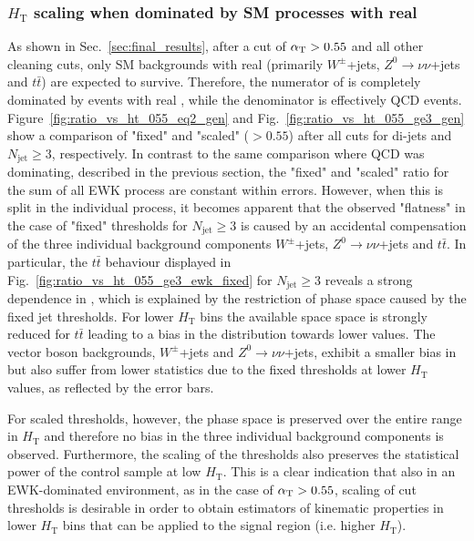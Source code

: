 \subsubsection{$H_{\mathrm{T}}$ scaling when dominated by SM processes
with real \mymet} 

As shown in Sec.~\ref{sec:final_results}, after a cut of $\alpha_{\mathrm{T}}>0.55$
and all other cleaning cuts, only SM backgrounds with real \mymet
(primarily $W^{\pm}$+jets, $Z^{0}\rightarrow\nu\nu$+jets and
$t\bar{t}$) are expected to survive. Therefore, the numerator of \RaT
is completely dominated by events with real \mymet, while the
denominator is effectively QCD
events. Figure~\ref{fig:ratio_vs_ht_055_eq2_gen} and
Fig.~\ref{fig:ratio_vs_ht_055_ge3_gen} show a comparison of "fixed"
and "scaled" \raT(\aT$>0.55$) after all cuts for di-jets and
$N_{\mathrm{jet}} \geq 3$, respectively. In contrast to the same
comparison where QCD was dominating, described in the previous
section, the "fixed" and "scaled" ratio for the sum of all EWK process
are constant within errors. However, when this is split in the
individual process, it becomes apparent that the observed "flatness"
in the case of "fixed" thresholds for $N_{\mathrm{jet}} \geq 3$ is
caused by an accidental compensation of the three individual
background components $W^{\pm}$+jets, $Z^{0}\rightarrow\nu\nu$+jets
and $t\bar{t}$. In particular, the $t\bar{t}$ behaviour displayed in
Fig.~\ref{fig:ratio_vs_ht_055_ge3_ewk_fixed} for $N_{\mathrm{jet}}
\geq 3$ reveals a strong dependence in \RaT, which is explained by the
restriction of phase space caused by the fixed jet \pt thresholds. For
lower $H_{\mathrm{T}}$ bins the available space space is strongly
reduced for $t\bar{t}$ leading to a bias in the \RaT distribution
towards lower values. The vector boson backgrounds, $W^{\pm}$+jets and
$Z^{0}\rightarrow\nu\nu$+jets, exhibit a smaller bias in \RaT but also
suffer from lower statistics due to the fixed thresholds at lower
$H_{\mathrm{T}}$ values, as reflected by the error bars.

For scaled thresholds, however, the phase space is preserved over the
entire range in $H_{\mathrm{T}}$ and therefore no \RaT bias in the
three individual background components is observed. Furthermore, the
scaling of the thresholds also preserves the statistical power of the
control sample at low $H_{\mathrm{T}}$.  This is a clear indication
that also in an EWK-dominated environment, as in the case of
$\alpha_{\mathrm{T}}>0.55$, scaling of cut thresholds is desirable in order to obtain
estimators of kinematic properties in lower $H_{\mathrm{T}}$ bins that
can be applied to the signal region (i.e. higher $H_{\mathrm{T}}$).

